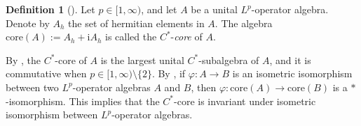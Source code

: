 \documentclass[reqno,11pt]{amsart}
\theoremstyle{plain}
\theoremstyle{definition}
\newtheorem{defn}[thm]{Definition}
\theoremstyle{remark}
\begin{document}
\begin{defn}[{\cite[Definition 2.10]{Choi and}}]
Let $p\in [1,\infty)$, and let $A$ be a unital $L^p$-operator algebra. Denote by $A_h$ the set of hermitian elements in $A$. The algebra $\mathrm{core}(A):={A_h}+\mathrm{i}{A_h}$ is called the $C^*$-{\it core} of $A$.
\end{defn}


By \cite[Theorem 2.9]{Choi and}, the $C^*$-core of $A$ is the largest unital $C^*$-subalgebra of $A$, and it is commutative when $p\in [1,\infty)\setminus\{2\}$.
By \cite[Proposition 2.13]{Choi and}, if $\varphi:A\rightarrow B$ is an isometric isomorphism between two $L^p$-operator algebras $A$ and $B$, then $\varphi: \mathrm{core}(A)\rightarrow \mathrm{core}(B)$ is a $*$-isomorphism. This implies that the $C^*$-core is invariant under isometric isomorphism between $L^p$-operator algebras.
\end{document}
